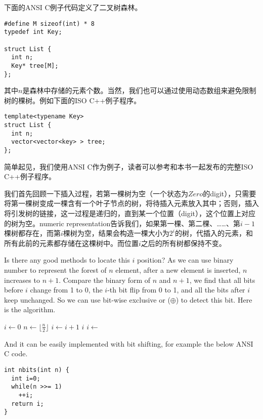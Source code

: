 \documentclass[UTF8]{article}
\begin{document}
下面的ANSI C例子代码定义了二叉树森林。

\lstset{language=C}
\begin{lstlisting}
#define M sizeof(int) * 8
typedef int Key;

struct List {
  int n;
  Key* tree[M];
};
\end{lstlisting}

其中$n$是森林中存储的元素个数。当然，我们也可以通过使用动态数组来避免限制树的棵树。例如下面的ISO C++例子程序。

\lstset{language=C++}
\begin{lstlisting}
template<typename Key>
struct List {
  int n;
  vector<vector<key> > tree;
};
\end{lstlisting}

简单起见，我们使用ANSI C作为例子，读者可以参考和本书一起发布的完整ISO C++例子程序。

我们首先回顾一下插入过程，若第一棵树为空（一个状态为$Zero$的digit），只需要将第一棵树变成一棵含有一个叶子节点的树，将待插入元素放入其中；否则，插入将引发树的链接，这一过程是递归的，直到某一个位置（digit），这个位置上对应的树为空。numeric representation告诉我们，如果第一棵、第二棵、……、第$i-1$棵树都存在，而第$i$棵树为空，结果会构造一棵大小为$2^i$的树，代插入的元素，和所有此前的元素都存储在这棵树中。而位置$i$之后的所有树都保持不变。

Is there any good methods to locate this $i$ position? As we can use binary number
to represent the forest of $n$ element, after a new element is inserted, $n$
increases to $n+1$. Compare the binary form of $n$ and $n+1$, we find that
all bits before $i$ change from 1 to 0, the $i$-th bit flip from 0 to 1, and
all the bits after $i$ keep unchanged. So we can use bit-wise exclusive or ($\oplus$) to detect
this bit. Here is the algorithm.

\begin{algorithmic}
  \State $i \gets 0$
    \State $ n \gets \lfloor \frac{n}{2} \rfloor$
    \State $ i \gets i + 1$
  \EndWhile
  \State \Return $i$
\EndFunction
\Statex
\State $i \gets $ 
\end{algorithmic}

And it can be easily implemented with bit shifting, for example the below ANSI C
code.

\begin{lstlisting}
int nbits(int n) {
  int i=0;
  while(n >>= 1)
    ++i;
  return i;
}
\end{lstlisting}
\end{document}

